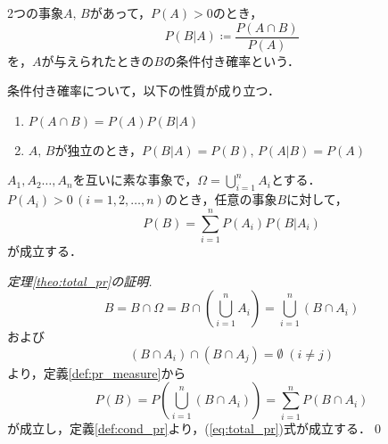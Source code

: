\documentclass{jsreport}
\begin{document}
\begin{screen}
  \begin{defi}[条件付き確率]\label{def:cond_pr}
    2つの事象$A, \, B$があって，$P(A) > 0$のとき，
    \begin{equation}
      P(B|A) \coloneqq \frac{P(A \cap B)}{P(A)} \nonumber
    \end{equation}
    を，$A$が与えられたときの$B$の条件付き確率という．
  \end{defi}
\end{screen}
条件付き確率について，以下の性質が成り立つ．
\begin{enumerate}
  \item $P(A \cap B) = P(A) P(B|A)$
  \item $A, \, B$が独立のとき，$P(B|A) = P(B), \, P(A|B) = P(A)$
\end{enumerate}

\begin{screen}
  \begin{theo}[全確率の法則]\label{theo:total_pr}
    $A_1, A_2 \ldots, A_n$を互いに素な事象で，$\Omega = \bigcup_{i = 1}^n A_i$とする．
    $P(A_i) > 0 \, (i = 1, 2, \ldots, n)$のとき，任意の事象$B$に対して，
    \begin{equation}\label{eq:total_pr}
      P(B) = \sum_{i = 1}^n P(A_i) P(B | A_i)
    \end{equation}
    が成立する．
  \end{theo}
\end{screen}

\begin{proof}[定理\ref{theo:total_pr}の証明]
  \begin{equation}
    B = B \cap \Omega = B \cap \left(\bigcup_{i = 1}^n A_i\right) = \bigcup_{i = 1}^n (B \cap A_i) \nonumber
  \end{equation}
  および
  \begin{equation}
    (B \cap A_i) \cap (B \cap A_j) = \emptyset \; (i \neq j) \nonumber
  \end{equation}
  より，定義\ref{def:pr_measure}から
  \begin{equation}
    P(B) = P\left(\bigcup_{i = 1}^n (B \cap A_i)\right) = \sum_{i = 1}^n P(B \cap A_i) \nonumber
  \end{equation}
  が成立し，定義\ref{def:cond_pr}より，(\ref{eq:total_pr})式が成立する．\qed
\end{proof}
\end{document}
